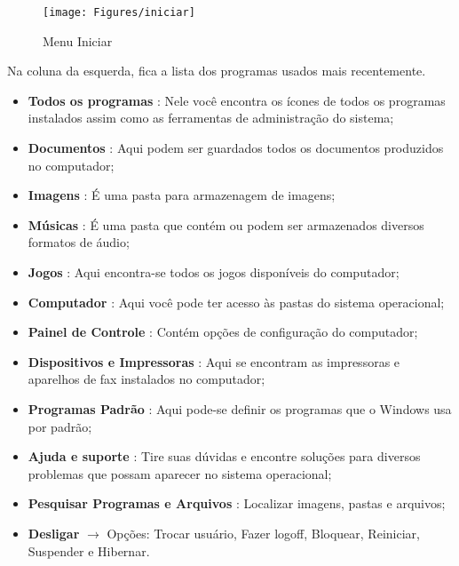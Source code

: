 \documentclass[hidelinks,12pt]{article}
\begin{document}
\begin{figure}[!h]
	\centering
	\texttt{[image: Figures/iniciar]}
	\caption{Menu Iniciar}
	\label{fig:iniciar}
\end{figure}

Na coluna da esquerda, fica a lista dos programas usados mais recentemente.

\begin{itemize}
	\item \textbf{Todos os programas} : Nele você encontra os ícones de todos os programas instalados assim como as ferramentas de administração do sistema;

	\item \textbf{Documentos} : Aqui podem ser guardados todos os documentos produzidos no computador;

	\item \textbf{Imagens} : É uma pasta para armazenagem de imagens;

	\item \textbf{Músicas} : É uma pasta que contém ou podem ser armazenados diversos formatos de áudio;

	\item \textbf{Jogos} : Aqui encontra-se todos os jogos disponíveis do computador;

	\item \textbf{Computador} : Aqui você pode ter acesso às pastas do sistema operacional;

	\item \textbf{Painel de Controle} : Contém opções de configuração do computador;

	\item \textbf{Dispositivos e Impressoras} : Aqui se encontram as impressoras e aparelhos de fax instalados no computador;

	\item \textbf{Programas Padrão} : Aqui pode-se definir os programas que o Windows usa por padrão;

	\item \textbf{Ajuda e suporte} : Tire suas dúvidas e encontre soluções para diversos problemas que possam aparecer no sistema operacional;

	\item \textbf{Pesquisar Programas e Arquivos} : Localizar imagens, pastas e arquivos;

	\item \textbf{Desligar} $\rightarrow$ Opções: Trocar usuário, Fazer logoff, Bloquear, Reiniciar, Suspender e Hibernar.
\end{itemize}
\end{document}
